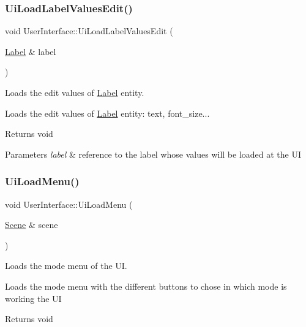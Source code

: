 \subsubsection{\texorpdfstring{Ui\+Load\+Label\+Values\+Edit()}{UiLoadLabelValuesEdit()}}
{\footnotesize\ttfamily void User\+Interface\+::\+Ui\+Load\+Label\+Values\+Edit (\begin{DoxyParamCaption}\item[{\hyperlink{class_label}{Label} \&}]{label }\end{DoxyParamCaption})}



Loads the edit values of \hyperlink{class_label}{Label} entity. 

Loads the edit values of \hyperlink{class_label}{Label} entity\+: text, font\+\_\+size...

\begin{DoxyReturn}{Returns}
void 
\end{DoxyReturn}

\begin{DoxyParams}{Parameters}
{\em label} & reference to the label whose values will be loaded at the UI \\
\hline
\end{DoxyParams}
\mbox{\label{class_user_interface_accd4f214f0fd8c55b36546e73a11d45d}} 
\subsubsection{\texorpdfstring{Ui\+Load\+Menu()}{UiLoadMenu()}}
{\footnotesize\ttfamily void User\+Interface\+::\+Ui\+Load\+Menu (\begin{DoxyParamCaption}\item[{\hyperlink{class_scene}{Scene} \&}]{scene }\end{DoxyParamCaption})}



Loads the mode menu of the UI. 

Loads the mode menu with the different buttons to chose in which mode is working the UI

\begin{DoxyReturn}{Returns}
void 
\end{DoxyReturn}
\mbox{\label{class_user_interface_a5546e5650bf7c4cdb0e41422655ac729}} 
